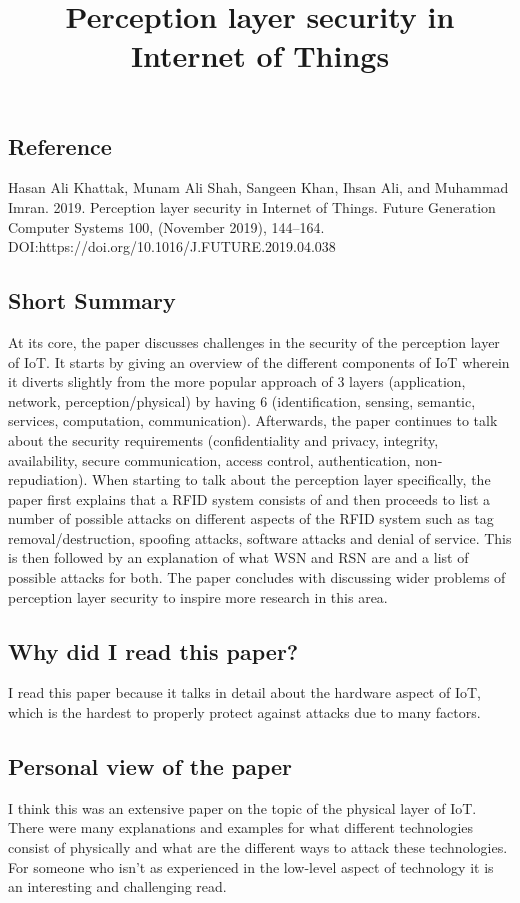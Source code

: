 \documentclass[11pt,a4paper]{article}
\title{Perception layer security in Internet of Things}
\author{}
\date{}
\begin{document}
\maketitle

\subsection*{Reference}
Hasan Ali Khattak, Munam Ali Shah, Sangeen Khan, Ihsan Ali, and Muhammad Imran. 2019. Perception layer security in Internet of Things. Future Generation Computer Systems 100, (November 2019), 144–164. DOI:https://doi.org/10.1016/J.FUTURE.2019.04.038

\subsection*{Short Summary} 
At its core, the paper discusses challenges in the security of the perception layer of IoT. It starts by giving an overview of the different components of IoT wherein it diverts slightly from the more popular approach of 3 layers (application, network, perception/physical) by having 6 (identification, sensing, semantic, services, computation, communication). Afterwards, the paper continues to talk about the security requirements (confidentiality and privacy, integrity, availability, secure communication, access control, authentication, non-repudiation). When starting to talk about the perception layer specifically, the paper first explains that a RFID system consists of and then proceeds to list a number of possible attacks on different aspects of the RFID system such as tag removal/destruction, spoofing attacks, software attacks and denial of service. This is then followed by an explanation of what WSN and RSN are and a list of possible attacks for both. The paper concludes with discussing wider problems of perception layer security to inspire more research in this area.

\subsection*{Why did I read this paper?}
I read this paper because it talks in detail about the hardware aspect of IoT, which is the hardest to properly protect against attacks due to many factors.

\subsection*{Personal view of the paper}
I think this was an extensive paper on the topic of the physical layer of IoT. There were many explanations and examples for what different technologies consist of physically and what are the different ways to attack these technologies. For someone who isn’t as experienced in the low-level aspect of technology it is an interesting and challenging read. 
\end{document}
